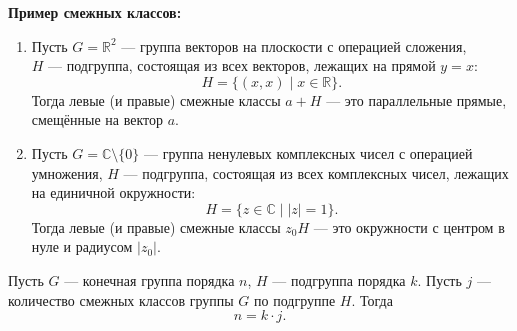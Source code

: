 \textbf{Пример смежных классов:}
\begin{enumerate}

    \item Пусть \( G = \mathbb{R}^2 \) — группа векторов на плоскости с операцией сложения, \\
    \( H \) — подгруппа, состоящая из всех векторов, лежащих на прямой \( y = x \):
    \[
    H = \{ (x, x) \mid x \in \mathbb{R} \}.
    \]
    Тогда левые (и правые) смежные классы \( a + H \) — это параллельные прямые, смещённые на вектор \( a \).

    
    \item Пусть \( G = \mathbb{C} \setminus \{ 0 \} \) — группа ненулевых комплексных чисел с операцией \\умножения,
    \( H \) — подгруппа, состоящая из всех комплексных чисел, лежащих на единичной окружности:
    \[
    H = \{ z \in \mathbb{C} \mid |z| = 1 \}.
    \]
    Тогда левые (и правые) смежные классы \( z_{0}H \) — это окружности с центром в нуле и радиусом \( |z_{0}| \).

\end{enumerate}

\begin{center}
\end{center}


\begin{shth}
    \begin{theorem}
        Пусть \( G \) — конечная группа порядка \( n \), \( H \) — подгруппа порядка \( k \). Пусть \( j \) — количество смежных классов группы \( G \) по подгруппе \( H \). Тогда 
        \[
        n = k \cdot j.
        \]
    \end{theorem}
\end{shth}

